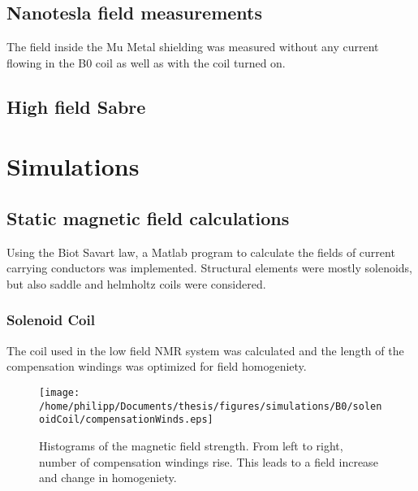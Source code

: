     \subsection{Nanotesla field measurements}
            The field inside the Mu Metal shielding was measured without any current flowing in the B0 coil as well as with the coil turned on.
    \subsection{High field Sabre}
\section{Simulations}
        \subsection{Static magnetic field calculations}
            Using the Biot Savart law, a Matlab program to calculate the fields of current carrying conductors was implemented. Structural elements were mostly solenoids, but also saddle and helmholtz coils were considered.
            \subsubsection{Solenoid Coil}
                The coil used in the low field NMR system was calculated and the length of the compensation windings was optimized for field homogeniety.
                \begin{figure}
                    \centering
                    \texttt{[image: /home/philipp/Documents/thesis/figures/simulations/B0/solenoidCoil/compensationWinds.eps]}
                    \caption[Compensation wind optimization]{Histograms of the magnetic field strength. From left to right, number of compensation windings rise. This leads to a field increase and change in homogeniety.}
                \label{fig:results:compensationWindOptimization}
            \end{figure}
